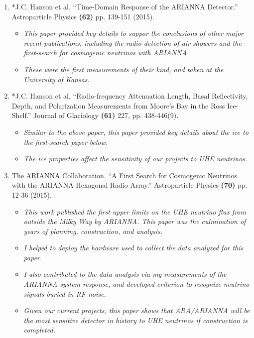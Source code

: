 \documentclass[../../main.tex]{subfiles}
\begin{document}
\begin{enumerate}
\item *J.C. Hanson et al. ``Time-Domain Response of the ARIANNA Detector.'' Astroparticle Physics \textbf{(62)} pp. 139-151 (2015).
\begin{itemize}
\item \textit{This paper provided key details to suppor the conclusions of other major recent publications, including the radio detection of air showers and the first-search for cosmogenic neutrinos with ARIANNA.}
\item \textit{These were the first measurements of their kind, and taken at the University of Kansas.}
\end{itemize}
\item *J.C. Hanson et al. ``Radio-frequency Attenuation Length, Basal Reflectivity, Depth, and Polarization Measurements from Moore's Bay in the Ross Ice-Shelf.'' Journal of Glaciology \textbf{(61)} 227, pp. 438-446(9).
\begin{itemize}
\item \textit{Similar to the above paper, this paper provided key details about the ice to the first-search paper below.}
\item \textit{The ice properties affect the sensitivity of our projects to UHE neutrinos.}
\end{itemize}
\item The ARIANNA Collaboration. ``A First Search for Cosmogenic Neutrinos with the ARIANNA Hexagonal Radio Array.'' Astroparticle Physics \textbf{(70)} pp. 12-36 (2015).
\begin{itemize}
\item \textit{This work published the first upper limits on the UHE neutrino flux from outside the Milky Way by ARIANNA.  This paper was the culmination of years of planning, construction, and analysis.}
\item \textit{I helped to deploy the hardware used to collect the data analyzed for this paper.}
\item \textit{I also contributed to the data analysis via my measurements of the ARIANNA system response, and developed criterion to recognize neutrino signals buried in RF noise.}
\item \textit{Given our current projects, this paper shows that ARA/ARIANNA will be the most sensitive detector in history to UHE neutrinos if construction is completed.}
\end{itemize}
\end{enumerate}
\end{document}
